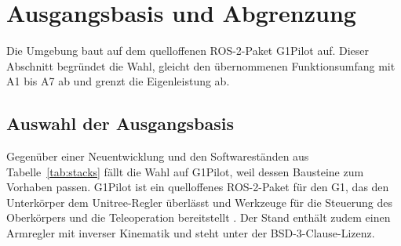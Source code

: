 
\section{Ausgangsbasis und Abgrenzung}
\label{sec:ausgangsbasis}
Die Umgebung baut auf dem quelloffenen ROS-2-Paket G1Pilot auf.
Dieser Abschnitt begründet die Wahl, gleicht den übernommenen Funktionsumfang mit A1 bis A7 ab und grenzt die Eigenleistung ab.

\subsection{Auswahl der Ausgangsbasis}
\label{sec:auswahl_basis}
Gegenüber einer Neuentwicklung und den Softwareständen aus Tabelle~\ref{tab:stacks} fällt die Wahl auf G1Pilot, weil dessen Bausteine zum Vorhaben passen.
G1Pilot ist ein quelloffenes ROS-2-Paket für den G1, das den Unterkörper dem Unitree-Regler überlässt und Werkzeuge für die Steuerung des Oberkörpers und die Teleoperation bereitstellt \cite{HucebotG1Pilot}.
Der Stand enthält zudem einen Armregler mit inverser Kinematik und steht unter der BSD-3-Clause-Lizenz.

